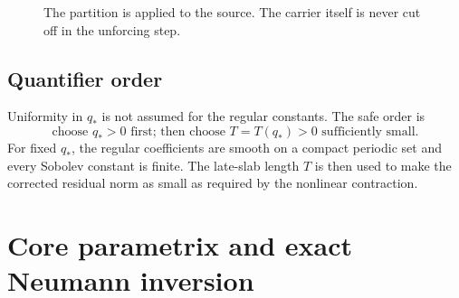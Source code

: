 \documentclass[11pt]{article}
\numberwithin{equation}{section}
\begin{document}
\begin{figure}[ht]
\centering
{}

\caption{The partition is applied to the source.  The carrier itself is never cut off in the unforcing step.}
\label{fig:sourcesplit}
\end{figure}

\subsection{Quantifier order}
Uniformity in \(q_*\) is not assumed for the regular constants.  The safe order is
\begin{equation}
\boxed{\text{choose }q_*>0\text{ first; then choose }T=T(q_*)>0\text{ sufficiently small}.}
\label{eq:quantifier}
\end{equation}
For fixed \(q_*\), the regular coefficients are smooth on a compact periodic set and every Sobolev constant is finite.  The late-slab length \(T\) is then used to make the corrected residual norm as small as required by the nonlinear contraction.

\section{Core parametrix and exact Neumann inversion}\label{sec:core}
\end{document}
